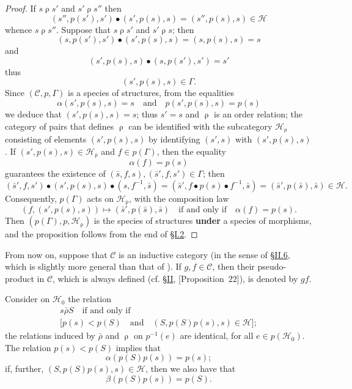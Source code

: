 \documentclass[a4paper,oneside,nobib,nofonts,notitlepage,notoc,nols,fleqn,justified]{tufte-book}
\newcommand{\oldpage}[1]{{\reversemarginpar\marginnote{\raggedleft\footnotesize\textit{p.~#1}}}}
\newcommand{\unsure}[1]{{\color{purple}\textbf{#1}}}
\newcommand{\CC}{\mathcal{C}}
\newcommand{\HH}{\mathcal{H}}
\newcommand{\relrho}{\mathrel{\rho}}
\newcommand{\relrhobar}{\mathrel{\bar{\rho}}}
\begin{document}
\begin{proof}
  If $s\relrho s'$ and $s'\relrho s''$ then
  \[
    (s'',p(s'),s')\bullet(s',p(s),s)
    = (s'',p(s),s)
    \in\HH
  \]
  whence $s\relrho s''$.
  Suppose that $s\relrho s'$ and $s'\relrho s$;
  then
  \[
    (s,p(s'),s')\bullet(s',p(s),s)
    = (s,p(s),s)
    = s
  \]
  and
  \[
    (s',p(s),s)\bullet(s,p(s'),s')
    = s'
  \]
  thus
  \[
    (s',p(s),s)\in\Gamma.
  \]
  \oldpage{359}
  Since $(\CC,p,\Gamma)$ is a species of structures, from the equalities
  \[
    \alpha(s',p(s),s)=s
    \quad\text{and}\quad
    p(s',p(s),s)=p(s)
  \]
  we deduce that $(s',p(s),s)=s$;
  thus $s'=s$ and $\relrho$ is an order relation;
  the category of pairs that defines $\relrho$ can be identified with the subcategory $\HH_{\relrho}$ consisting of elements $(s',p(s),s)$ by identifying $(s',s)$ with $(s',p(s),s)$.
  If $(s',p(s),s)\in\HH_{\relrho}$ and $f\in p(\Gamma)$, then the equality
  \[
    \alpha(f)=p(s)
  \]
  guarantees the existence of $(\bar{s},f,s),(\bar{s}',f,s')\in\Gamma$;
  then
  \[
    (\bar{s}',f,s')\bullet(s',p(s),s)\bullet(s,f^{-1},\bar{s})
    = (\bar{s}',f\bullet p(s)\bullet f^{-1},\bar{s})
    = (\bar{s}',p(\bar{s}),\bar{s})
    \in\HH.
  \]
  Consequently, $p(\Gamma)$ acts on $\HH_{\relrho}$, with the composition law
  \[
    (f,(s',p(s),s))
    \longmapsto (\bar{s}',p(\bar{s}),\bar{s})
    \quad\text{if and only if}\quad
    \alpha(f)=p(s).
  \]
  Then $(p(\Gamma),p,\HH_{\relrho})$ is the species of structures \unsure{under} a species of morphisms, and the proposition follows from the end of \hyperref[section:i.2]{§I.2}.
\end{proof}

From now on, suppose that $\CC$ is an inductive category (in the sense of \hyperref[section:ii.6]{§II.6}, which is slightly more general than that of \cite{3c}).
If $g,f\in\CC$, then their pseudo-product in $\CC$, which is always defined (cf. \hyperref[section:ii]{§II}, \hyperref[proposition:22][Proposition~22]), is denoted by $gf$.

Consider on $\HH_0$ the relation
\[
  \begin{gathered}
    s\relrhobar S
    \quad\text{if and only if}\quad
  \\\big[p(s)<p(S)
    \quad\text{and}\quad
    (S,p(S)p(s),s)\in\HH\big];
  \end{gathered}
\]
the relations induced by $\relrhobar$ and $\relrho$ on $p^{-1}(e)$ are identical, for all $e\in p(\HH_0)$.
The relation $p(s)<p(S)$ implies that
\[
  \alpha(p(S)p(s))
  = p(s);
\]
if, further, $(S,p(S)p(s),s)\in\HH$, then we also have that
\[
  \beta(p(S)p(s))
  = p(S).
\]
\end{document}

